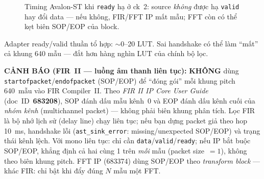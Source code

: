 \begin{figure}[H]
\centering
{}
\caption{Timing Avalon-ST khi \texttt{ready} hạ ở ck~2: source \emph{không} được hạ \texttt{valid} hay đổi data --- nếu không, FIR/FFT IP mất mẫu; FFT còn có thể kẹt biên SOP/EOP của block.}
\label{fig:avalon_st_timing}
\end{figure}

\begin{costbox}
Adapter ready/valid thuần tổ hợp: $\sim$0--20 LUT. Sai handshake có thể làm ``mất'' cả khung 640 mẫu --- đắt hơn hàng nghìn LUT của chính bộ lọc.
\end{costbox}

\noindent\textbf{CẢNH BÁO (FIR~II --- luồng âm thanh liên tục):} \textbf{KHÔNG} dùng \texttt{startofpacket}/\texttt{endofpacket} (SOP/EOP) để ``đóng gói'' mỗi khung pitch 640~mẫu vào FIR Compiler~II. Theo \emph{FIR II IP Core User Guide} (doc~ID~\textbf{683208}), SOP đánh dấu mẫu kênh~0 và EOP đánh dấu kênh cuối của \emph{nhóm kênh} (multichannel packet) --- không phải biên khung phân tích. Lọc FIR là bộ nhớ lịch sử (delay line) chạy liên tục; nếu bạn dựng packet giả theo hop 10~ms, handshake lỗi (\texttt{ast\_sink\_error}: missing/unexpected SOP/EOP) và trạng thái kênh lệch. Với mono liên tục: chỉ cần \texttt{data}/\texttt{valid}/\texttt{ready}; nếu IP bắt buộc SOP/EOP, khẳng định cả hai cùng 1 trên \emph{mỗi} mẫu (packet size~$=1$), không theo biên khung pitch. FFT IP (683374) dùng SOP/EOP theo \emph{transform block} --- khác FIR: chỉ bật khi đẩy đúng $N$ mẫu một FFT.

